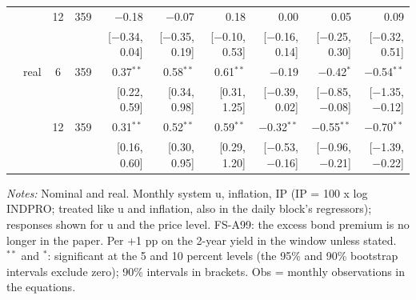 \begin{longtable}{llcrrrrrrr}
 &  & 12 & 359 & $-$0.18 & $-$0.07 & 0.18 & 0.00 & 0.05 & 0.09\\
 & & & & {\scriptsize [$-$0.34, 0.04]} & {\scriptsize [$-$0.35, 0.19]} & {\scriptsize [$-$0.10, 0.53]} & {\scriptsize [$-$0.16, 0.14]} & {\scriptsize [$-$0.25, 0.30]} & {\scriptsize [$-$0.32, 0.51]}\\
 & real & 6 & 359 & 0.37$^{**}$ & 0.58$^{**}$ & 0.61$^{**}$ & $-$0.19 & $-$0.42$^{*}$ & $-$0.54$^{**}$\\
 & & & & {\scriptsize [0.22, 0.59]} & {\scriptsize [0.34, 0.98]} & {\scriptsize [0.31, 1.25]} & {\scriptsize [$-$0.39, 0.02]} & {\scriptsize [$-$0.85, $-$0.08]} & {\scriptsize [$-$1.35, $-$0.12]}\\
 &  & 12 & 359 & 0.31$^{**}$ & 0.52$^{**}$ & 0.59$^{**}$ & $-$0.32$^{**}$ & $-$0.55$^{**}$ & $-$0.70$^{**}$\\
 & & & & {\scriptsize [0.16, 0.60]} & {\scriptsize [0.30, 0.95]} & {\scriptsize [0.29, 1.20]} & {\scriptsize [$-$0.53, $-$0.16]} & {\scriptsize [$-$0.96, $-$0.21]} & {\scriptsize [$-$1.39, $-$0.22]}\\
\end{longtable}
\begin{flushleft}\footnotesize\textit{Notes:} Nominal and real. Monthly system u, inflation, IP (IP = 100 x log INDPRO; treated like u and inflation, also in the daily block's regressors); responses shown for u and the price level. FS-A99: the excess bond premium is no longer in the paper. Per +1 pp on the 2-year yield in the window unless stated. $^{**}$ and $^{*}$: significant at the 5 and 10 percent levels (the 95\% and 90\% bootstrap intervals exclude zero); 90\% intervals in brackets. Obs = monthly observations in the equations.\end{flushleft}
\endgroup
